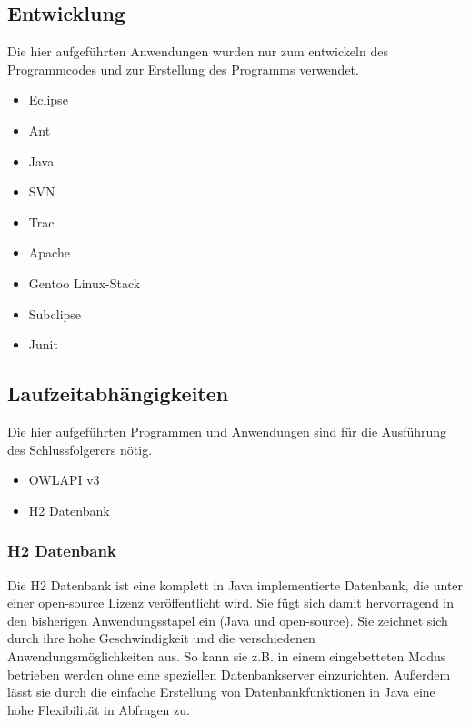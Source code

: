 \subsection{Entwicklung}

Die hier aufgeführten Anwendungen wurden nur zum entwickeln des Programmcodes und zur Erstellung des Programms verwendet.
\begin{itemize}
  \item Eclipse
  \item Ant
  \item Java
  \item SVN
  \item Trac
  \item Apache
  \item Gentoo Linux-Stack
  \item Subclipse
  \item Junit
\end{itemize}

\subsection{Laufzeitabhängigkeiten}
Die hier aufgeführten Programmen und Anwendungen sind für die Ausführung des Schlussfolgerers nötig.
\begin{itemize}
  \item OWLAPI v3 \cite{Horridge2009}
  \item H2 Datenbank
\end{itemize}
 
\subsubsection*{H2 Datenbank}
Die H2 Datenbank ist eine komplett in Java implementierte Datenbank, die unter einer open-source Lizenz veröffentlicht wird. Sie fügt sich damit hervorragend in den bisherigen Anwendungsstapel ein (Java und open-source). Sie zeichnet sich durch ihre hohe Geschwindigkeit und die verschiedenen Anwendungsmöglichkeiten aus. So kann sie z.B. in einem eingebetteten Modus betrieben werden ohne eine speziellen Datenbankserver einzurichten. Außerdem lässt sie durch die einfache Erstellung von Datenbankfunktionen in Java eine hohe Flexibilität in Abfragen zu.
